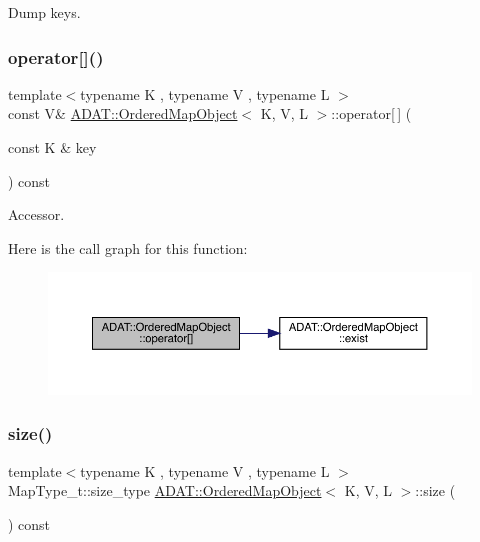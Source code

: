 Dump keys. 

\mbox{\label{classADAT_1_1OrderedMapObject_ad6bf82315b8676a1e7a5733ad6d48e85}} 
\subsubsection{\texorpdfstring{operator[]()}{operator[]()}}
{\footnotesize\ttfamily template$<$typename K , typename V , typename L $>$ \\
const V\& \mbox{\hyperlink{classADAT_1_1OrderedMapObject}{A\+D\+A\+T\+::\+Ordered\+Map\+Object}}$<$ K, V, L $>$\+::operator\mbox{[}$\,$\mbox{]} (\begin{DoxyParamCaption}\item[{const K \&}]{key }\end{DoxyParamCaption}) const\hspace{0.3cm}{\ttfamily [inline]}}



Accessor. 

Here is the call graph for this function\+:\nopagebreak
\begin{figure}[H]
\begin{center}
\leavevmode
\includegraphics[width=350pt]{db/d8c/classADAT_1_1OrderedMapObject_ad6bf82315b8676a1e7a5733ad6d48e85_cgraph}
\end{center}
\end{figure}
\mbox{\label{classADAT_1_1OrderedMapObject_a3d96d76de0ad61fb858509543c3f60f4}} 
\subsubsection{\texorpdfstring{size()}{size()}}
{\footnotesize\ttfamily template$<$typename K , typename V , typename L $>$ \\
Map\+Type\+\_\+t\+::size\+\_\+type \mbox{\hyperlink{classADAT_1_1OrderedMapObject}{A\+D\+A\+T\+::\+Ordered\+Map\+Object}}$<$ K, V, L $>$\+::size (\begin{DoxyParamCaption}{ }\end{DoxyParamCaption}) const\hspace{0.3cm}{\ttfamily [inline]}}




